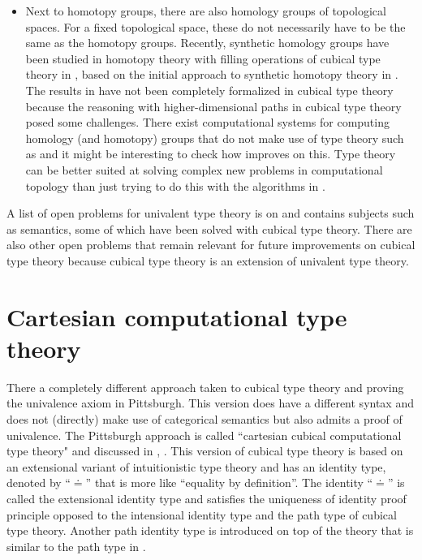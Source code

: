 \documentclass[12pt,a4paper,twoside,xetex]{book} %
\begin{document}
\begin{itemize}
\item Next to homotopy groups, there are also homology groups of topological 
spaces. For a fixed topological space, these do not necessarily have to be the 
same as the homotopy groups. Recently, synthetic homology groups have  been 
studied in homotopy theory with filling operations of cubical type theory in 
\cite{Graham2018}, based on the initial approach to synthetic homotopy theory in 
\cite{Licata2015}. The results in \cite{Graham2018} have not been completely 
formalized in cubical type theory because the reasoning with higher-dimensional 
paths in cubical type theory posed some challenges. There exist computational 
systems for computing homology  (and homotopy) groups that do not make use of 
type theory such as \cite{GaSeSi99} and it might be interesting to check how 
\cite{Graham2018} improves on this. Type theory can be better suited at solving 
complex new problems in computational topology than just trying to do this with 
the algorithms in \cite{GaSeSi99}.
\end{itemize}

A list of open problems for univalent type theory is on \cite{Awodey2019} and 
contains subjects such as semantics, some of which have been solved with cubical 
type theory. There are also other open problems that remain relevant for future 
improvements on cubical type theory because cubical type theory is an extension 
of univalent type theory.





\section{Cartesian computational type theory}\label{comptt}

There a completely different approach taken to cubical type theory and proving the univalence axiom in Pittsburgh. This version does have a different syntax and does not (directly) make use of categorical semantics but also admits a proof of univalence. The Pittsburgh approach is called ``cartesian cubical computational type theory" and discussed in  \cite{Angiuli2017}, \cite{Angiuli2018}. This version of 
cubical type theory is based on an extensional variant of intuitionistic type 
theory and has an identity type, denoted by ``$\doteq$'' that is more 
like ``equality by definition''. The identity ``$\doteq$'' is called the extensional identity type and satisfies the uniqueness of identity proof principle opposed to the intensional identity type  and the path type of cubical type theory. Another path identity 
type is introduced on top of the theory that is similar to the path type in . 
\end{document}
